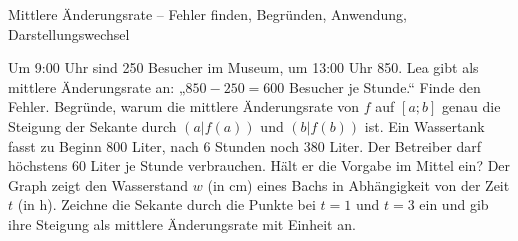 \begin{aufgabe}{Mittlere Änderungsrate – Fehler finden, Begründen, Anwendung, Darstellungswechsel}
\begin{teile}
\teil Um 9:00 Uhr sind 250 Besucher im Museum, um 13:00 Uhr 850. Lea gibt als mittlere Änderungsrate an: „$850 - 250 = 600$ Besucher je Stunde.“ Finde den Fehler.
\teil Begründe, warum die mittlere Änderungsrate von $f$ auf $[a; b]$ genau die Steigung der Sekante durch $(a | f(a))$ und $(b | f(b))$ ist.
\teil Ein Wassertank fasst zu Beginn $800$ Liter, nach $6$ Stunden noch $380$ Liter. Der Betreiber darf höchstens $60$ Liter je Stunde verbrauchen. Hält er die Vorgabe im Mittel ein?
\teil Der Graph zeigt den Wasserstand $w$ (in cm) eines Bachs in Abhängigkeit von der Zeit $t$ (in h). Zeichne die Sekante durch die Punkte bei $t = 1$ und $t = 3$ ein und gib ihre Steigung als mittlere Änderungsrate mit Einheit an.

\begin{ksys}[xmin=0,xmax=4,ymin=0,ymax=8,xlabel=t in h,ylabel=w in cm,ablesen]\end{ksys}
\end{teile}
\end{aufgabe}
